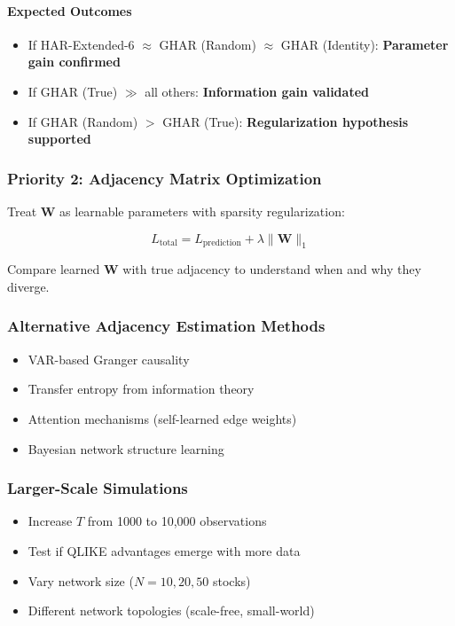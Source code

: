 \documentclass[10pt,a4paper]{article}
\newcommand{\bW}{\boldsymbol{W}}
\begin{document}
\paragraph{Expected Outcomes}

\begin{itemize}
\item If HAR-Extended-6 $\approx$ GHAR (Random) $\approx$ GHAR (Identity): \textbf{Parameter gain confirmed}
\item If GHAR (True) $\gg$ all others: \textbf{Information gain validated}
\item If GHAR (Random) $>$ GHAR (True): \textbf{Regularization hypothesis supported}
\end{itemize}

\subsubsection{Priority 2: Adjacency Matrix Optimization}

Treat $\bW$ as learnable parameters with sparsity regularization:

\begin{equation}
L_{\text{total}} = L_{\text{prediction}} + \lambda \|\bW\|_1
\end{equation}

Compare learned $\bW$ with true adjacency to understand when and why they diverge.

\subsubsection{Alternative Adjacency Estimation Methods}

\begin{itemize}
\item VAR-based Granger causality
\item Transfer entropy from information theory
\item Attention mechanisms (self-learned edge weights)
\item Bayesian network structure learning
\end{itemize}

\subsubsection{Larger-Scale Simulations}

\begin{itemize}
\item Increase $T$ from 1000 to 10,000 observations
\item Test if QLIKE advantages emerge with more data
\item Vary network size ($N = 10, 20, 50$ stocks)
\item Different network topologies (scale-free, small-world)
\end{itemize}
\end{document}
